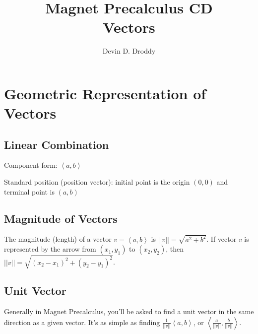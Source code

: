\documentclass{report}
\title{\Huge{Magnet Precalculus CD}\\Vectors}
\author{\huge{Devin D. Droddy}}
\date{}
\begin{document}
\maketitle
\newpage%
\tableofcontents
\pagebreak

\chapter{Geometric Representation of Vectors}

\section{Linear Combination}
\noindent Component form: $\left\langle a,b \right\rangle$

\noindent Standard position (position vector): initial point is the origin $(0,0)$ and terminal point is $(a,b)$


\section{Magnitude of Vectors}

The magnitude (length) of a vector $v=\left\langle a,b \right\rangle$ is $||v||=\sqrt{a^2+b^2}$. If vector $v$ is represented by the arrow from $(x_1,y_1)$ to $(x_2,y_2)$, then $||v||=\sqrt{(x_2-x_1)^2+(y_2-y_1)^2}$.

\section{Unit Vector}


Generally in Magnet Precalculus, you'll be asked to find a unit vector in the same direction as a given vector. It's as simple as finding $\frac{1}{||v||}\left\langle a,b \right\rangle$, or $\left\langle \frac{a}{||v||},\frac{b}{||v||} \right\rangle$.
\end{document}
